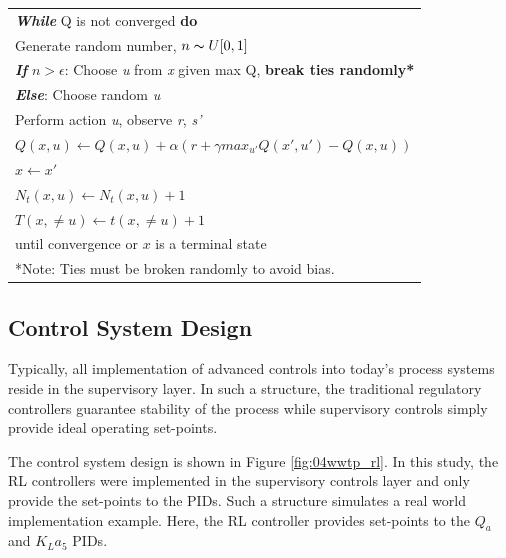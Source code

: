 \begin{table}[h]
\begin{tabular}{p{14cm}}
		\hspace{1cm} \textbf{\emph{While}} Q is not converged \textbf{do} \\
		\hspace{2cm} Generate random number, $n \thicksim U[0, 1]$ \\
		\hspace{2cm} \textbf{\emph{If}} $n > \epsilon$: Choose \emph{u} from \emph{x} given max Q, \textbf{break ties randomly*} \\
		\hspace{2cm} \textbf{\emph{Else}}: Choose random \emph{u} \\
		\hspace{2cm} Perform action \emph{u}, observe \emph{r}, \emph{s'} \\
		\hspace{2cm} $Q(x, u) \leftarrow Q(x, u) + \alpha(r + \gamma max_{u'} Q(x', u') - Q(x, u))$ \\
		\hspace{2cm} $x \leftarrow x'$ \\
		\hspace{2cm} $N_t(x, u) \leftarrow N_t(x, u) + 1$ \\
		\hspace{2cm} $T(x, \neq u) \leftarrow t(x, \neq u) + 1$ \\
		\hspace{1cm} until convergence or $x$ is a terminal state \\ \hline
		*Note: Ties must be broken randomly to avoid bias.
	\end{tabular}
\end{table}

\subsection{Control System Design}
Typically, all implementation of advanced controls into today's process systems reside in the supervisory layer. In such a structure, the traditional regulatory controllers guarantee stability of the process while supervisory controls simply provide ideal operating set-points.

The control system design is shown in Figure \ref{fig:04wwtp_rl}. In this study, the RL controllers were implemented in the supervisory controls layer and only provide the set-points to the PIDs. Such a structure simulates a real world implementation example. Here, the RL controller provides set-points to the $Q_a$ and $K_La_5$ PIDs.

